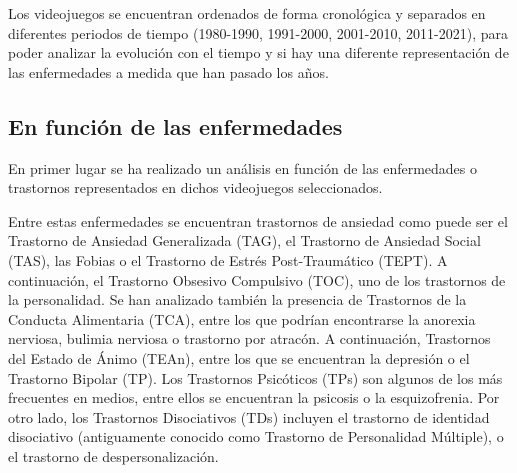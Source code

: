 \documentclass[12pt, a4paper,twoside,titlepage]{book}
\begin{document}
Los videojuegos se encuentran ordenados de forma cronológica y separados en diferentes periodos de tiempo (1980-1990, 1991-2000, 2001-2010, 2011-2021), para poder analizar la evolución con el tiempo y si hay una diferente representación de las enfermedades a medida que han pasado los años. 

\subsection{En función de las enfermedades} 
    \label{sec:enfermedades}
    En primer lugar se ha realizado un análisis en función de las enfermedades o trastornos representados en dichos videojuegos seleccionados. 
    
    Entre estas enfermedades se encuentran trastornos de ansiedad como puede ser el Trastorno de Ansiedad Generalizada (TAG), el Trastorno de Ansiedad Social (TAS), las Fobias o el Trastorno de Estrés Post-Traumático (TEPT). A continuación, el Trastorno Obsesivo Compulsivo (TOC), uno de los trastornos de la personalidad. Se han analizado también la presencia de Trastornos de la Conducta Alimentaria (TCA), entre los que podrían encontrarse la anorexia nerviosa, bulimia nerviosa o trastorno por atracón. A continuación, Trastornos del Estado de Ánimo (TEAn), entre los que se encuentran la depresión o el Trastorno Bipolar (TP). Los Trastornos Psicóticos (TPs) son algunos de los más frecuentes en medios, entre ellos se encuentran la psicosis o la esquizofrenia. Por otro lado, los Trastornos Disociativos (TDs) incluyen el trastorno de identidad disociativo (antiguamente conocido como Trastorno de Personalidad Múltiple), o el trastorno de despersonalización. 
    
\end{document}
